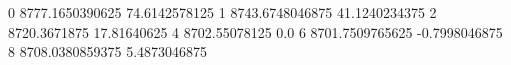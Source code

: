 0 8777.1650390625 74.6142578125
1 8743.6748046875 41.1240234375
2 8720.3671875 17.81640625
4 8702.55078125 0.0
6 8701.7509765625 -0.7998046875
8 8708.0380859375 5.4873046875
